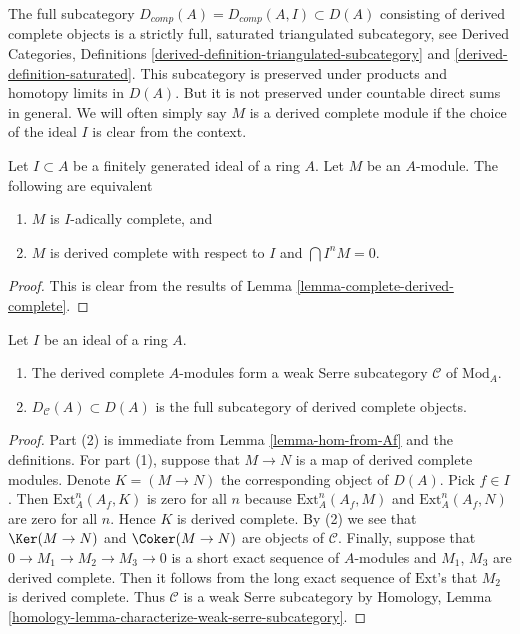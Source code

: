 \noindent
The full subcategory $D_{comp}(A) = D_{comp}(A, I) \subset D(A)$
consisting of derived complete objects is a strictly full, saturated
triangulated subcategory, see
Derived Categories, Definitions
\ref{derived-definition-triangulated-subcategory} and
\ref{derived-definition-saturated}. This subcategory is preserved
under products and homotopy limits in $D(A)$.
But it is not preserved under countable direct sums in general.
We will often simply say $M$ is a derived complete module if
the choice of the ideal $I$ is clear from the context.

\begin{proposition}
\label{proposition-derived-complete-modules}
Let $I \subset A$ be a finitely generated ideal of a ring $A$.
Let $M$ be an $A$-module. The following are equivalent
\begin{enumerate}
\item $M$ is $I$-adically complete, and
\item $M$ is derived complete with respect to $I$ and $\bigcap I^nM = 0$.
\end{enumerate}
\end{proposition}

\begin{proof}
This is clear from the results of
Lemma \ref{lemma-complete-derived-complete}.
\end{proof}

\begin{lemma}
\label{lemma-serre-subcategory}
Let $I$ be an ideal of a ring $A$.
\begin{enumerate}
\item The derived complete $A$-modules form a weak Serre
subcategory $\mathcal{C}$ of $\text{Mod}_A$.
\item $D_\mathcal{C}(A) \subset D(A)$ is the full subcategory
of derived complete objects.
\end{enumerate}
\end{lemma}

\begin{proof}
Part (2) is immediate from Lemma \ref{lemma-hom-from-Af}
and the definitions. For part (1), suppose that $M \to N$ is
a map of derived complete modules. Denote $K = (M \to N)$
the corresponding object of $D(A)$. Pick $f \in I$. Then
$\text{Ext}_A^n(A_f, K)$ is zero for all $n$ because
$\text{Ext}_A^n(A_f, M)$ and $\text{Ext}_A^n(A_f, N)$ are zero for all $n$.
Hence $K$ is derived complete. By (2) we see that $\Ker(M \to N)$ and
$\Coker(M \to N)$ are objects of $\mathcal{C}$.
Finally, suppose that $0 \to M_1 \to M_2 \to M_3 \to 0$
is a short exact sequence of $A$-modules and
$M_1$, $M_3$ are derived complete. Then it follows from
the long exact sequence of $\text{Ext}$'s that $M_2$
is derived complete. Thus $\mathcal{C}$ is a weak Serre subcategory by
Homology, Lemma \ref{homology-lemma-characterize-weak-serre-subcategory}.
\end{proof}

